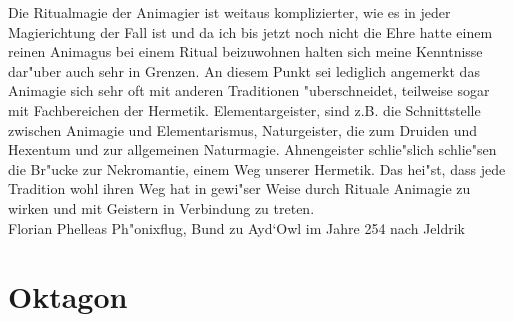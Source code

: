 \documentclass[a5paper,8pt]{book}
\begin{document}
Die Ritualmagie der Animagier ist weitaus komplizierter, wie es in jeder Magierichtung der Fall ist und da ich bis jetzt noch nicht die Ehre 
hatte einem reinen Animagus bei einem Ritual beizuwohnen halten sich meine Kenntnisse dar"uber auch sehr in Grenzen. An diesem Punkt sei 
lediglich angemerkt das Animagie sich sehr oft mit anderen Traditionen "uberschneidet, teilweise sogar mit Fachbereichen der Hermetik. 
Elementargeister, sind z.B. die Schnittstelle zwischen Animagie und Elementarismus, Naturgeister, die zum Druiden und Hexentum und zur 
allgemeinen Naturmagie. Ahnengeister schlie"slich schlie"sen die Br"ucke zur Nekromantie, einem Weg unserer Hermetik. 
Das hei"st, dass jede Tradition wohl ihren Weg hat in gewi"ser Weise durch Rituale Animagie zu wirken und mit Geistern in Verbindung zu treten.\\

Florian Phelleas Ph"onixflug, Bund zu Ayd`Owl im Jahre 254 nach Jeldrik

\newpage

\section{Oktagon}
\end{document}
